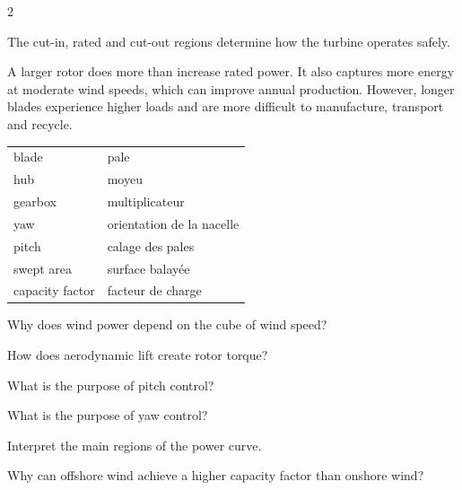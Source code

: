 \begin{multicols}{2}
\begin{tcolorbox}[title=\sffamily\bfseries Typical power curve,colback=white,colframe=ECGreen]
\centering
{}
{\scriptsize The cut-in, rated and cut-out regions determine how the turbine operates safely.}
\end{tcolorbox}

\begin{tcolorbox}[title=\sffamily\bfseries Engineering Insight,colback=white,colframe=ECOrange]
A larger rotor does more than increase rated power. It also captures more energy at moderate wind speeds, which can improve annual production. However, longer blades experience higher loads and are more difficult to manufacture, transport and recycle.
\end{tcolorbox}

\begin{vocabulary}
\begin{tabularx}{\linewidth}{@{}lX@{}}
blade & pale\\
hub & moyeu\\
gearbox & multiplicateur\\
yaw & orientation de la nacelle\\
pitch & calage des pales\\
swept area & surface balayée\\
capacity factor & facteur de charge
\end{tabularx}
\end{vocabulary}

\begin{questions}
\item Why does wind power depend on the cube of wind speed?
\item How does aerodynamic lift create rotor torque?
\item What is the purpose of pitch control?
\item What is the purpose of yaw control?
\item Interpret the main regions of the power curve.
\item Why can offshore wind achieve a higher capacity factor than onshore wind?
\end{questions}


\end{multicols}
